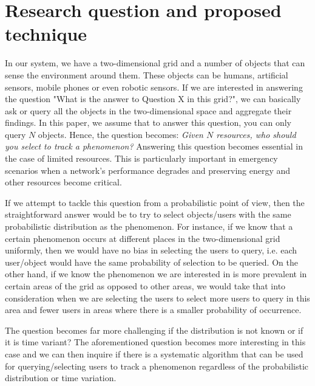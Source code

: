 \documentclass{acm_proc_article-sp}
\begin{document}
\section{Research question and proposed technique}
In our system, we have a two-dimensional grid and a number of objects that can sense the environment around them. These objects can be humans, artificial sensors, mobile phones or even robotic sensors. If we are interested in answering the question "What is the answer to Question X in this grid?", we can basically ask or query all the objects in the two-dimensional space and aggregate their findings. In this paper, we assume that to answer this question, you can only query $N$ objects. Hence, the question becomes: \textit{Given $N$ resources, who should you select to track a phenomenon?} Answering this question becomes essential in the case of limited resources. This is particularly important in emergency scenarios when a network's performance degrades and preserving energy and other resources become critical.\par
If we attempt to tackle this question from a probabilistic point of view, then the straightforward answer would be to try to select objects/users with the same probabilistic distribution as the phenomenon. For instance, if we know that a certain phenomenon occurs at different places in the two-dimensional grid uniformly, then we would have no bias in selecting the users to query, i.e. each user/object would have the same probability of selection to be queried. On the other hand, if we know the phenomenon we are interested in is more prevalent in certain areas of the grid as opposed to other areas, we would take that into consideration when we are selecting the users to select more users to query in this area and fewer users in areas where there is a smaller probability of occurrence.\par
The question becomes far more challenging if the distribution is not known or if it is time variant? The aforementioned question becomes more interesting in this case and we can then inquire if there is a systematic algorithm that can be used for querying/selecting users to track a phenomenon regardless of the probabilistic distribution or time variation. \par
\end{document}
